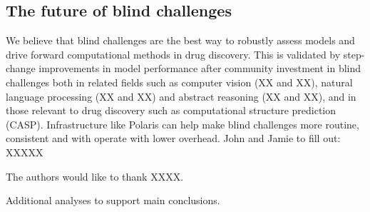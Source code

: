 \documentclass[journal=jcim,manuscript=article]{achemso}
\begin{document}
\subsection{The future of blind challenges}

We believe that blind challenges are the best way to robustly assess models and drive forward computational methods in drug discovery. This is validated by step-change improvements in model performance after community investment in blind challenges both in related fields such as computer vision (XX and XX), natural language processing (XX and XX) and abstract reasoning (XX and XX), and in those relevant to drug discovery such as computational structure prediction (CASP). Infrastructure like Polaris can help make blind challenges more routine, consistent and with operate with lower overhead. John and Jamie to fill out: XXXXX


\begin{acknowledgement}

The authors would like to thank XXXX. 

\end{acknowledgement}

\begin{suppinfo}

Additional analyses to support main conclusions. 

\end{suppinfo}


\end{document}
